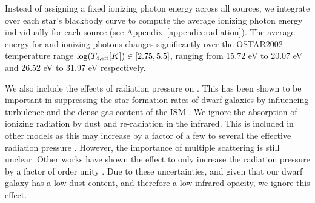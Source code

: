 \documentclass[twocolumn]{aastex61}
\begin{document}

Instead of assigning a fixed ionizing photon energy across all sources, we integrate over each star's blackbody curve to compute the average ionizing photon energy individually for each source (see Appendix~\ref{appendix:radiation}). The average energy for  and  ionizing photons changes significantly over the OSTAR2002 temperature range $\log(T_{4,\rm{eff}} [K]) \in \left[2.75,5.5\right]$, ranging from 15.72 eV to 20.07 eV and 26.52 eV to 31.97 eV respectively.

We also include the effects of radiation pressure on . This has been shown to be important in suppressing the star formation rates of dwarf galaxies by influencing turbulence and the dense gas content of the ISM \citep{WiseAbel2012,Ceverino2014}. We ignore the absorption of ionizing radiation by dust and re-radiation in the infrared. This is included in other models \citep[e.g.][]{Rosdahl2015,FIRE,FIRE2} as this may increase by a factor of a few to several the effective radiation pressure \citep{ZhangDavis2017}. However, the importance of multiple scattering is still unclear. Other works have shown the effect to only increase the radiation pressure by a factor of order unity \citep{Krumholz2012,Krumholz2013,Reissl2017}. Due to these uncertainties, and given that our dwarf galaxy has a low dust content, and therefore a low infrared opacity, we ignore this effect. 
\end{document}
